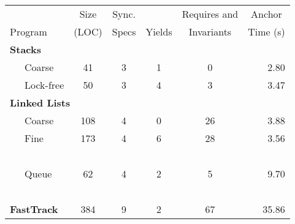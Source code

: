\documentclass{article}
\begin{document}
       \begin{tabular}{llccccr}
       & & \multicolumn{1}{c}{Size}  & \multicolumn{1}{c}{Sync.} & & \multicolumn{1}{c}{Requires and}  & \multicolumn{1}{c}{Anchor}  \\
        \multicolumn{2}{l}{Program} & \multicolumn{1}{c}{(LOC)}  & \multicolumn{1}{c}{Specs} & \multicolumn{1}{c}{Yields} &  \multicolumn{1}{c}{Invariants} & \multicolumn{1}{c}{Time (s)} \\
        \toprule
      
\multicolumn{7}{l}{\bf Stacks}\\
 &  Coarse  &  41  &  3  &  1  &  0  &  2.80 \\   %
 &  Lock-free  &  50  &  3  &  4  &  3  &  3.47 \\   %
\multicolumn{7}{l}{\bf Linked Lists}\\
 &  Coarse  &  108  &  4  &  0  &  26  &  3.88 \\   %
 &  Fine~  &  173  &  4  &  6  &  28  &  3.56 \\   %
~\\[-1ex]
 &  Queue  &  62  &  4  &  2  &  5  &  9.70 \\   %
~\\[-1ex]
 \multicolumn{2}{l}{\bf FastTrack}  &  384  &  9  &  2  &  67  &  35.86 \\   %

\bottomrule
\end{tabular}
\end{document}
